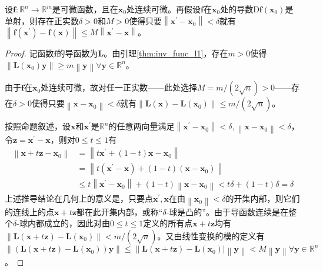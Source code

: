\documentclass[../main.tex]{subfiles}
\begin{document}
\begin{lemma}\label{thm:inv_func_l3}
    设$\mathbf{f}:\mathbb{R}^n\rightarrow\mathbb{R}^m$是可微函数，且在$\mathbf{x}_0$处连续可微。再假设$\mathbf{f}$在$\mathbf{x}_0$处的导数$\mathrm{D}\mathbf{f}\left(\mathbf{x}_0\right)$是单射，则存在正实数$\delta>0$和$M>0$使得只要$\left\|\mathbf{x}^\prime-\mathbf{x}_0\right\|<\delta$就有$\left\|\mathbf{f}\left(\mathbf{x}^\prime\right)-\mathbf{f}\left(\mathbf{x}\right)\right\|\leq M\left\|\mathbf{x}^\prime-\mathbf{x}\right\|$。
\end{lemma}
\begin{proof}
    记函数$\mathbf{f}$的导函数为$\mathbf{L}$。由引理\ref{thm:inv_func_l1}，存在$m>0$使得$\left\|\mathbf{L}\left(\mathbf{x}_0\right)\mathbf{y}\right\|\geq m\left\|\mathbf{y}\right\|\forall\mathbf{y}\in\mathbb{R}^n$。

    由于$\mathbf{f}$在$\mathbf{x}_0$处连续可微，故对任一正实数——此处选择$M=m/\left(2\sqrt{n}\right)>0$——存在$\delta>0$使得只要$\left\|\mathbf{x}-\mathbf{x}_0\right\|<\delta$就有$\left\|\mathbf{L}\left(\mathbf{x}\right)-\mathbf{L}\left(\mathbf{x}_0\right)\right\|\leq m/\left(2\sqrt{n}\right)$。

    按照命题叙述，设$\mathbf{x}$和$\mathbf{x}^\prime$是$\mathbb{R}^n$的任意两向量满足$\left\|\mathbf{x}^\prime-\mathbf{x}_0\right\|<\delta,\left\|\mathbf{x}-\mathbf{x}_0\right\|<\delta$，令$\mathbf{z}=\mathbf{x}^\prime-\mathbf{x}$，则对$0\leq t\leq 1$有
    \begin{align*}
        \left\|\mathbf{x}+t\mathbf{z}-\mathbf{x}_0\right\| & =\left\|t\mathbf{x}^\prime+\left(1-t\right)\mathbf{x}-\mathbf{x}_0\right\|                                                                       \\
                                                           & =\left\|t\left(\mathbf{x}^\prime-\mathbf{x}\right)+\left(1-t\right)\left(\mathbf{x}-\mathbf{x}_0\right)\right\|                                  \\
                                                           & \leq t\left\|\mathbf{x}^\prime-\mathbf{x}_0\right\|+\left(1-t\right)\left\|\mathbf{x}-\mathbf{x}_0\right\|<t\delta+\left(1-t\right)\delta=\delta
    \end{align*}
    上述推导结论在几何上的意义是，只要点$\mathbf{x}^\prime,\mathbf{x}$在由$\left\|\mathbf{x}_0\right\|<\delta$的开集内部，则它们的连线上的点$\mathbf{x}+t\mathbf{z}$都在此开集内部，或称“$\delta$-球是凸的”。由于导函数连续是在整个$\delta$-球内都成立的，因此对由$0\leq t\leq 1$定义的所有点$\mathbf{x}+t\mathbf{z}$均有$\left\|\mathbf{L}\left(\mathbf{x}+t\mathbf{z}\right)-\mathbf{L}\left(\mathbf{x}_0\right)\right\|<m/\left(2\sqrt{n}\right)$。又由线性变换的模的定义有$\left\|\left(\mathbf{L}\left(\mathbf{x}+t\mathbf{z}\right)-\mathbf{L}\left(\mathbf{x}_0\right)\right)\mathbf{y}\right\|\leq\left\|\mathbf{L}\left(\mathbf{x}+t\mathbf{z}\right)-\mathbf{L}\left(\mathbf{x}_0\right)\right|\left\|\mathbf{y}\right\|<M\left\|\mathbf{y}\right\|\forall\mathbf{y}\in\mathbb{R}^n$。


\end{proof}
\end{document}
